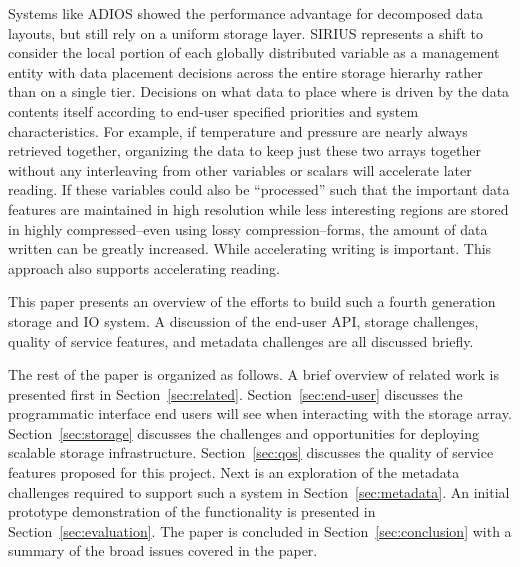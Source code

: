 \documentclass[letterpaper,twocolumn,10pt]{article}
\begin{document}
Systems like ADIOS showed the performance advantage for decomposed data
layouts, but still rely on a uniform storage layer. SIRIUS represents a shift
to consider the local portion of each globally distributed variable as a
management entity with data placement decisions across the entire storage
hierarhy rather than on a single tier.  Decisions on what data to place where
is driven by the data contents itself according to end-user specified
priorities and system characteristics. For example, if temperature and pressure
are nearly always retrieved together, organizing the data to keep just these
two arrays together without any interleaving from other variables or scalars
will accelerate later reading. If these variables could also be ``processed''
such that the important data features are maintained in high resolution while
less interesting regions are stored in highly compressed--even using lossy
compression--forms, the amount of data written can be greatly increased. While
accelerating writing is important. This approach also supports accelerating
reading.

This paper presents an overview of the efforts to build such a fourth
generation storage and IO system. A discussion of the end-user API, storage
challenges, quality of service features, and metadata challenges are all
discussed briefly.


The rest of the paper is organized as follows. A brief overview of related work
is presented first in Section~\ref{sec:related}. Section~\ref{sec:end-user}
discusses the programmatic interface end users will see when interacting with
the storage array.
Section~\ref{sec:storage}
discusses the challenges and opportunities for deploying scalable storage
infrastructure.
Section~\ref{sec:qos}
discusses the quality of service features proposed for this project.
Next is an exploration of the metadata challenges required to support such a
system in Section~\ref{sec:metadata}.
An initial prototype demonstration of the functionality is presented in
Section~\ref{sec:evaluation}.
The paper is concluded in
Section~\ref{sec:conclusion} with a summary of the broad issues covered in the
paper.
\end{document}
